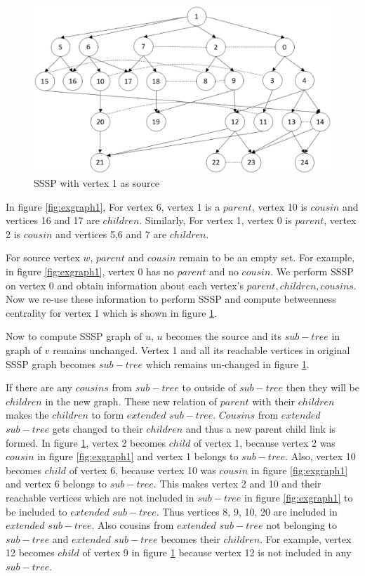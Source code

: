 \begin{figure}
\hspace{-6.5em}
\includegraphics[width=21cm]{images/Slide2.eps}
\caption{SSSP with vertex 1 as source}
\label{fig:exgraph2}
\end{figure}

In figure \ref{fig:exgraph1}, For vertex 6, vertex 1 is a $parent$, vertex 10 is $cousin$ and vertices 16 and 17 are $ children$. Similarly, For vertex 1, vertex 0 is $parent$, vertex 2 is $cousin$ and vertices 5,6 and 7 are $children$. 

For source vertex $w$, $parent$ and $cousin$ remain to be an empty set.
For example, in figure \ref{fig:exgraph1}, vertex 0 has no $parent$ and no $cousin$.
We perform SSSP on vertex 0 and obtain information about each vertex's $parent, children, cousins$. Now we re-use these information to perform SSSP and compute betweenness centrality for vertex 1 which is shown in figure \ref{fig:exgraph2}.

Now to compute SSSP graph of $u$, $u$ becomes the source and its $sub-tree$ in graph of $v$ remains unchanged.
Vertex 1 and all its reachable vertices in original SSSP graph becomes $sub-tree$ which remains un-changed in figure \ref{fig:exgraph2}.

If there are any $cousins$ from $sub-tree$ to outside of $sub-tree$ then they will be $children$ in the new graph. These new relation of $parent$ with their $children$ makes the $children$ to form $extended$ $sub-tree$.
$Cousins$ from $extended$ $sub-tree$ gets changed to their $children$ and thus a new parent child link is formed.
In figure \ref{fig:exgraph2}, vertex 2 becomes $child$ of vertex 1, because vertex 2 was $cousin$ in figure \ref{fig:exgraph1} and vertex 1 belongs to $sub-tree$. Also, vertex 10 becomes $child$ of vertex 6, because vertex 10 was $cousin$ in figure \ref{fig:exgraph1} and vertex 6 belongs to $sub-tree$. This makes vertex 2 and 10 and their reachable vertices which are not included in $sub-tree$ in figure \ref{fig:exgraph1} to be included to $extended$ $sub-tree$. Thus vertices 8, 9, 10, 20 are included in $extended$ $sub-tree$. Also cousins from $extended$ $sub-tree$ not belonging to $sub-tree$ and $extended$ $sub-tree$ becomes their $children$. For example, vertex 12 becomes $child$ of vertex 9 in figure \ref{fig:exgraph2} because vertex 12 is not included in any $sub-tree$. 

